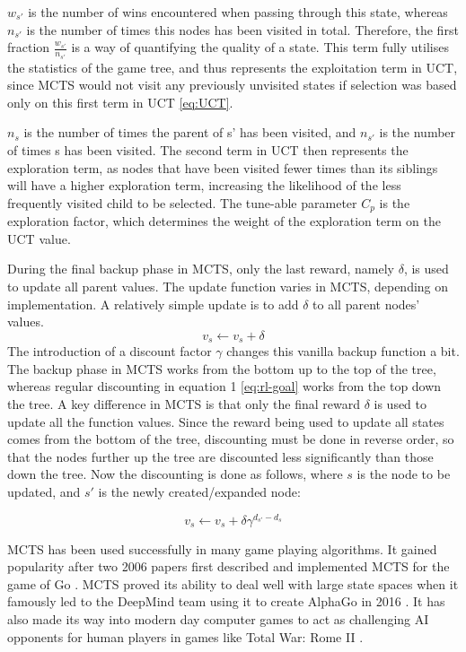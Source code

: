 \documentclass[12pt,a4paper]{article}
\begin{document}
\begin{multicols}{2}
$w_{s'}$ is the number of wins encountered when passing through this state, whereas $n_{s'}$ is the number of times this nodes has been visited in total. Therefore, the first fraction $\frac{w_{s'}}{n_{s'}}$ is a way of quantifying the quality of a state. This term fully utilises the statistics of the game tree, and thus represents the exploitation term in UCT, since MCTS would not visit any previously unvisited states if selection was based only on this first term in UCT \eqref{eq:UCT}.

$n_s$ is the number of times the parent of s' has been visited, and $n_{s'}$ is the number of times s has been visited. The second term in UCT then represents the exploration term, as nodes that have been visited fewer times than its siblings will have a higher exploration term, increasing the likelihood of the less frequently visited child to be selected. The tune-able parameter $C_{p}$ is the exploration factor, which determines the weight of the exploration term on the UCT value.

During the final backup phase in MCTS, only the last reward, namely $\delta$, is used to update all parent values. The update function varies in MCTS, depending on implementation. A relatively simple update is to add $\delta$ to all parent nodes' values.
\begin{equation}
	v_s \gets v_s + \delta
	\label{eq:backup-vanilla}
\end{equation}
The introduction of a discount factor $\gamma$ changes this vanilla backup function a bit. The backup phase in MCTS works from the bottom up to the top of the tree, whereas regular discounting in equation 1 \eqref{eq:rl-goal} works from the top down the tree. A key difference in MCTS is that only the final reward $\delta$ is used to update all the function values. Since the reward being used to update all states comes from the bottom of the tree, discounting must be done in reverse order, so that the nodes further up the tree are discounted less significantly than those down the tree.
Now the discounting is done as follows, where $s$ is the node to be updated, and $s'$ is the newly created/expanded node:

\begin{equation}
	v_s \gets v_s + \delta\gamma^{d_{s'}-d_{s}}
	\label{eq:backup-discounted}
\end{equation}

MCTS has been used successfully in many game playing algorithms. It gained popularity after two 2006 papers first described and implemented MCTS for the game of Go \cite{Coulom06mcts} \cite{Kocsis-Szepesv:2006}. MCTS proved its ability to deal well with large state spaces when it famously led to the DeepMind team using it to create AlphaGo in 2016 \cite{Silver_2016}. It has also made its way into modern day computer games to act as challenging AI opponents for human players in games like Total War: Rome II \cite{MCTS-total-war}.


\end{multicols}
\end{document}
